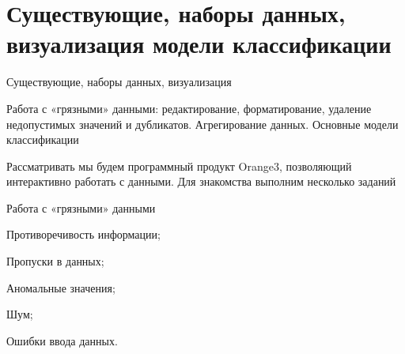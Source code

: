 \documentclass{beamer}
\begin{document}
\section{ Существующие, наборы данных, визуализация модели классификации}

\begin{frame}{Существующие, наборы данных, визуализация}

Работа с «грязными» данными: редактирование, форматирование, 
удаление недопустимых значений и дубликатов. 
Агрегирование данных. Основные модели классификации

Рассматривать мы будем  программный продукт Orange3, позволяющий  интерактивно работать с данными.
Для знакомства выполним несколько заданий



\end{frame}

\begin{frame}{Работа с «грязными» данными}

Противоречивость информации;

Пропуски в данных;

Аномальные значения;

Шум;

Ошибки ввода данных. 

\end{frame}

  
  




\end{document}
